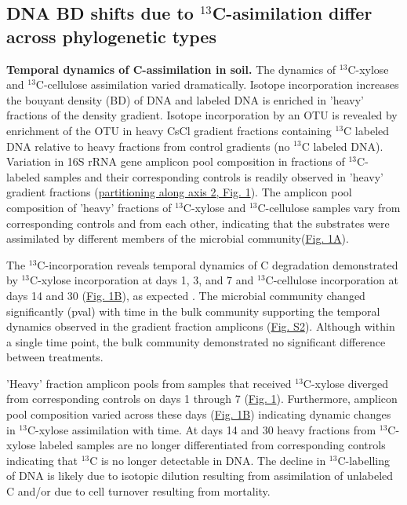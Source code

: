\subsection{DNA BD shifts due to $^{13}$C-asimilation differ across phylogenetic types}
\textbf{Temporal dynamics of C-assimilation in soil.}  
The dynamics of $^{13}$C-xylose and $^{13}$C-cellulose assimilation varied
dramatically. Isotope incorporation increases the bouyant density (BD) of DNA
and labeled DNA is enriched in 'heavy' fractions of the density gradient.
Isotope incorporation by an OTU is revealed by enrichment of the OTU in heavy
CsCl gradient fractions containing $^{13}$C labeled DNA relative to heavy
fractions from control gradients (no $^{13}$C labeled DNA). Variation in 16S
rRNA gene amplicon pool composition in fractions of $^{13}$C-labeled samples
and their corresponding controls is readily observed in 'heavy' gradient
fractions
(\href{https://www.authorea.com/users/3537/articles/3612/master/file/figures/ordination_all1/ordination_all1.png}{partitioning
along axis 2, Fig. 1}). The amplicon pool composition of 'heavy' fractions of
$^{13}$C-xylose and $^{13}$C-cellulose samples vary from corresponding controls
and from each other, indicating that the substrates were assimilated by
different members of the  microbial
community(\href{https://www.authorea.com/users/3537/articles/3612/master/file/figures/ordination_all1/ordination_all1.png}{Fig.
1A}).

The $^{13}$C-incorporation reveals temporal dynamics of C
degradation demonstrated by $^{13}$C-xylose incorporation at days
1, 3, and 7 and $^{13}$C-cellulose incorporation at days 14 and 30
(\href{https://www.authorea.com/users/3537/articles/3612/master/file/figures/ordination_all1/ordination_all1.png}{Fig.
1B}), as expected \citep{Amelung_2008}. The microbial community changed
significantly (pval) with time in the bulk community supporting the temporal
dynamics observed in the gradient fraction amplicons
(\href{https://authorea.com/users/3537/articles/8459/master/file/figures/bulk_ordination/bulk_ordination.png}{Fig.
S2}). Although within a single time point, the bulk community demonstrated no
significant difference between treatments. 

'Heavy' fraction amplicon pools from samples that received
$^{13}$C-xylose diverged from corresponding controls on days 1
through 7
(\href{https://www.authorea.com/users/3537/articles/3612/master/file/figures/ordination_all1/ordination_all1.png}{Fig.
1}). Furthermore, amplicon pool composition varied across these days
(\href{https://www.authorea.com/users/3537/articles/3612/master/file/figures/ordination_all1/ordination_all1.png}{Fig.
1B}) indicating dynamic changes in $^{13}$C-xylose assimilation
with time. At days 14 and 30 heavy fractions from $^{13}$C-xylose
labeled samples are no longer differentiated from corresponding controls
indicating that $^{13}$C is no longer detectable in DNA. The
decline in $^{13}$C-labelling of DNA is likely due to isotopic
dilution resulting from assimilation of unlabeled C and/or due to cell turnover
resulting from mortality. 

